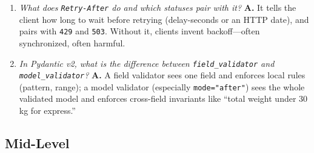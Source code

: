 \begin{enumerate}[label=\textbf{Q\arabic*.}, leftmargin=3.2em]
{        handling?} \textbf{A.} Never. \texttt{detail} is human-facing,
        per-occurrence, and free to change (or be localized). Clients match
        on \texttt{type} and machine-readable extension members like
        \texttt{code}.
  \item \emph{What does \texttt{Retry-After} do and which statuses pair with
        it?} \textbf{A.} It tells the client how long to wait before
        retrying (delay-seconds or an HTTP date), and pairs with
        \texttt{429} and \texttt{503}. Without it, clients invent
        backoff---often synchronized, often harmful.
  \item \emph{In Pydantic v2, what is the difference between
        \texttt{field\_validator} and \texttt{model\_validator}?}
        \textbf{A.} A field validator sees one field and enforces local
        rules (pattern, range); a model validator (especially
        \texttt{mode="after"}) sees the whole validated model and enforces
        cross-field invariants like ``total weight under 30 kg for
        express.''
\end{enumerate}

\subsection*{Mid-Level}

